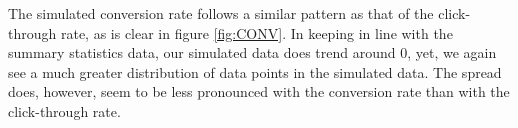 The simulated conversion rate follows a similar pattern as that of the click-through rate, as is clear in figure \ref{fig:CONV}. In keeping in line with the summary statistics data, our simulated data does trend around 0, yet, we again see a much greater distribution of data points in the simulated data. The spread does, however, seem to be less pronounced with the conversion rate than with the click-through rate.
